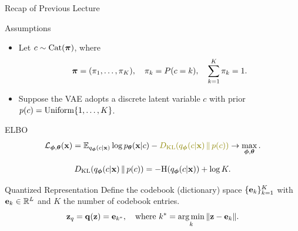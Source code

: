 \documentclass{beamer}
\begin{document}
\begin{frame}{Recap of Previous Lecture}
	\begin{block}{Assumptions}
		\begin{itemize}
			\item Let $c \sim \operatorname{Cat}(\boldsymbol{\pi})$, where 
			\vspace{-0.6cm}
			\[
				\boldsymbol{\pi} = (\pi_1, \dots, \pi_K), \quad \pi_k = P(c = k), \quad \sum_{k=1}^K \pi_k = 1.
			\]
			\vspace{-0.7cm}
			\item Suppose the VAE adopts a discrete latent variable $c$ with prior $p(c) = \operatorname{Uniform}\{1, \dots, K\}$.
		\end{itemize}
	\end{block}
	\vspace{-0.3cm}
	\begin{block}{ELBO}
		\vspace{-0.7cm}
		\[
			\cL_{\bphi, \btheta}(\bx)  = \bbE_{q_{\bphi}(c| \bx)} \log \pt(\bx| c) - {\color{olive} \KL(q_{\bphi}(c| \bx) \,\|\, p(c))} \rightarrow \max_{\bphi, \btheta}.
		\]
	\end{block}
	\vspace{-1.0cm}
	\[
		D_\mathrm{KL}(q_{\boldsymbol{\phi}}(c| \mathbf{x}) \,\|\, p(c)) = - \mathrm{H}(q_{\boldsymbol{\phi}}(c| \mathbf{x})) + \log K. 
	\]		
	\vspace{-0.5cm}
	\begin{block}{Quantized Representation}
		Define the codebook (dictionary) space $\{\mathbf{e}_k\}_{k=1}^K$ with $\mathbf{e}_k \in \mathbb{R}^L$ and $K$ the number of codebook entries.
		\vspace{-0.3cm}
		\[
			\mathbf{z}_q = \mathbf{q} (\mathbf{z}) = \mathbf{e}_{k^*}, \quad \text{where } k^* = \operatorname*{arg\,min}_k \| \mathbf{z} - \mathbf{e}_k \|.
		\]
		\vspace{-0.7cm}
	\end{block}
\end{frame}
\end{document}
